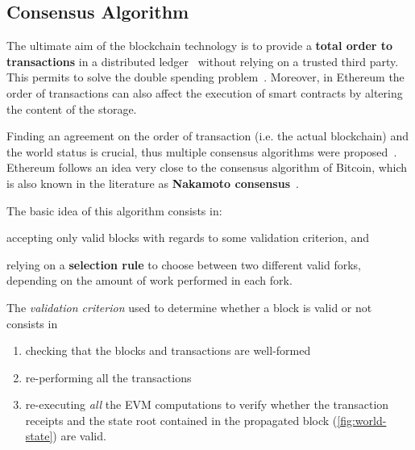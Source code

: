 \subsection{Consensus Algorithm}
\label{sec:consensus}

The ultimate aim of the blockchain technology is to provide a \textbf{total
order to transactions} in a distributed ledger~\cite{bib:the-quest} without
relying on a trusted third party. This permits to solve the double spending
problem~\cite{bib:bitcoin}. Moreover, in Ethereum the order of transactions can
also affect the execution of smart contracts by altering the content of the
storage.

Finding an agreement on the order of transaction (i.e. the actual blockchain)
and the world status is crucial, thus multiple consensus algorithms were
proposed~\cite{}. Ethereum follows an idea very close to the consensus algorithm
of Bitcoin, which is also known in the literature as \textbf{Nakamoto
consensus}~\cite{}.

The basic idea of this algorithm consists in:
\begin{enumerate*}[label=(\arabic*)]
	\item accepting only valid blocks with regards to some validation criterion,
	and
	\item relying on a \textbf{selection rule} to choose between two different
	valid forks, depending on the amount of work performed in each fork.
\end{enumerate*}

The \emph{validation criterion} used to determine whether a block is valid or
not consists in
\begin{enumerate}
	\item checking that the blocks and transactions are well-formed
	\item re-performing all the transactions
	\item re-executing \emph{all}	the EVM computations to verify whether the
	transaction receipts and the state root contained in the propagated block
	(\autoref{fig:world-state}) are valid.
\end{enumerate}

